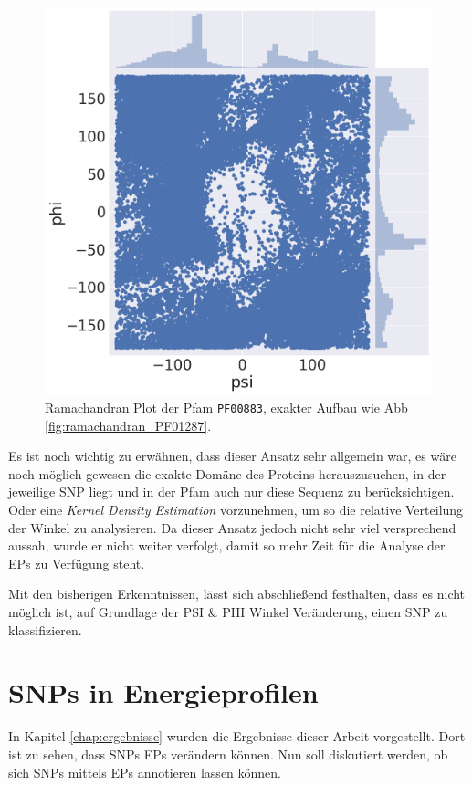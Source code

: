 \begin{figure}
    \centering
    \includegraphics[width=.90\textwidth]{images/ramachandranplot_PF00883.png}
    \caption{Ramachandran Plot der Pfam \texttt{PF00883}, exakter Aufbau wie \ac{Abb} \ref{fig:ramachandran_PF01287}.}
    \label{fig:ramachandran_PF00883}
\end{figure}

Es ist noch wichtig zu erwähnen, dass dieser Ansatz sehr allgemein war, es wäre noch möglich gewesen die exakte Domäne des Proteins herauszusuchen, in der jeweilige \ac{SNP} liegt und in der \ac{Pfam} auch nur diese Sequenz zu berücksichtigen. Oder eine \emph{Kernel Density Estimation}\cite{Parzen.1962} vorzunehmen, um so die relative Verteilung der Winkel zu analysieren. Da dieser Ansatz jedoch nicht sehr viel versprechend aussah, wurde er nicht weiter verfolgt, damit so mehr Zeit für die Analyse der \ac{EP}s zu Verfügung steht.

Mit den bisherigen Erkenntnissen, lässt sich abschließend festhalten, dass es nicht möglich ist, auf Grundlage der PSI \& PHI Winkel Veränderung, einen \ac{SNP} zu klassifizieren.


\section{SNPs in Energieprofilen}
\label{sec:snps_in_eps}
In Kapitel \ref{chap:ergebnisse} wurden die Ergebnisse dieser Arbeit vorgestellt. Dort ist zu sehen, dass \ac{SNP}s \ac{EP}s verändern können. Nun soll diskutiert werden, ob sich \ac{SNP}s mittels \ac{EP}s annotieren lassen können.

